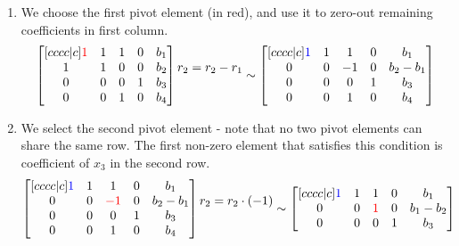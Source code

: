 \begin{enumerate}
\item We choose the first pivot element (in red), and use it to zero-out remaining coefficients in first column.
\begin{equation}
\begin{bmatrix}[cccc|c]
    \textcolor{red}{1} & 1 & 1 & 0 & b_1 \\ 
    1 & 1 & 0 & 0 & b_2 \\ 
    0 & 0 & 0 & 1 & b_3 \\ 
    0 & 0 & 1 & 0 & b_4
\end{bmatrix}
\begin{matrix} \\ r_2 = r_2 - r_1 \\ \\ \\ \end{matrix} \sim
\begin{bmatrix}[cccc|c]
    \textcolor{blue}{1} & 1 & 1 & 0 & b_1 \\ 
    0 & 0 & -1 & 0 & b_2 - b_1 \\ 
    0 & 0 & 0 & 1 & b_3 \\ 
    0 & 0 & 1 & 0 & b_4
\end{bmatrix}
\end{equation}
\item We select the second pivot element - note that no two pivot elements can share the same row.
The first non-zero element that satisfies this condition is coefficient of $x_3$ in the second row.
\begin{equation}
\begin{bmatrix}[cccc|c]
    \textcolor{blue}{1} & 1 & 1 & 0 & b_1 \\ 
    0 & 0 & \textcolor{red}{-1} & 0 & b_2 - b_1 \\ 
    0 & 0 & 0 & 1 & b_3 \\ 
    0 & 0 & 1 & 0 & b_4
\end{bmatrix}
\begin{matrix} \\ r_2 = r_2 \cdot (-1) \\ \\ \\ \end{matrix} \sim
\begin{bmatrix}[cccc|c]
    \textcolor{blue}{1} & 1 & 1 & 0 & b_1 \\ 
    0 & 0 & \textcolor{red}{1} & 0 & b_1 - b_2 \\ 
    0 & 0 & 0 & 1 & b_3 \\ 

\end{bmatrix}
\end{equation}
\end{enumerate}
